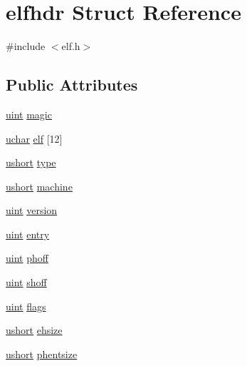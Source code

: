 \hypertarget{structelfhdr}{}\section{elfhdr Struct Reference}
\label{structelfhdr}


{\ttfamily \#include $<$elf.\+h$>$}

\subsection*{Public Attributes}
\begin{DoxyCompactItemize}
\item 
\hyperlink{custom__types_8h_a91ad9478d81a7aaf2593e8d9c3d06a14}{uint} \hyperlink{structelfhdr_a28ee8116d69b533277311c5f3773b6b2}{magic}
\item 
\hyperlink{custom__types_8h_a65f85814a8290f9797005d3b28e7e5fc}{uchar} \hyperlink{structelfhdr_a22ec6f2383f0488ee18a18673398f201}{elf} \mbox{[}12\mbox{]}
\item 
\hyperlink{custom__types_8h_ab95f123a6c9bcfee6a343170ef8c5f69}{ushort} \hyperlink{structelfhdr_a2cd2eaf0c952e30f8196890787ef68fe}{type}
\item 
\hyperlink{custom__types_8h_ab95f123a6c9bcfee6a343170ef8c5f69}{ushort} \hyperlink{structelfhdr_a17113c58d39b044bb1ae78733a8c68fc}{machine}
\item 
\hyperlink{custom__types_8h_a91ad9478d81a7aaf2593e8d9c3d06a14}{uint} \hyperlink{structelfhdr_abb1c8274f47cfdbbcefe44af2d5c723d}{version}
\item 
\hyperlink{custom__types_8h_a91ad9478d81a7aaf2593e8d9c3d06a14}{uint} \hyperlink{structelfhdr_ad40755e1b2c6efc3ec0ad95889f743a5}{entry}
\item 
\hyperlink{custom__types_8h_a91ad9478d81a7aaf2593e8d9c3d06a14}{uint} \hyperlink{structelfhdr_a1d463f67fcf951c06cfaa37850004c51}{phoff}
\item 
\hyperlink{custom__types_8h_a91ad9478d81a7aaf2593e8d9c3d06a14}{uint} \hyperlink{structelfhdr_a465ccdf83d0e26d129d723a493a6e764}{shoff}
\item 
\hyperlink{custom__types_8h_a91ad9478d81a7aaf2593e8d9c3d06a14}{uint} \hyperlink{structelfhdr_a2f1e0957c83938630ef0ed074830df03}{flags}
\item 
\hyperlink{custom__types_8h_ab95f123a6c9bcfee6a343170ef8c5f69}{ushort} \hyperlink{structelfhdr_aeffe5743cc720e5795af5d17b6fd6928}{ehsize}
\item 
\hyperlink{custom__types_8h_ab95f123a6c9bcfee6a343170ef8c5f69}{ushort} \hyperlink{structelfhdr_ac636a4a9c4c61933c6044275ed687bc9}{phentsize}

\end{DoxyCompactItemize}

